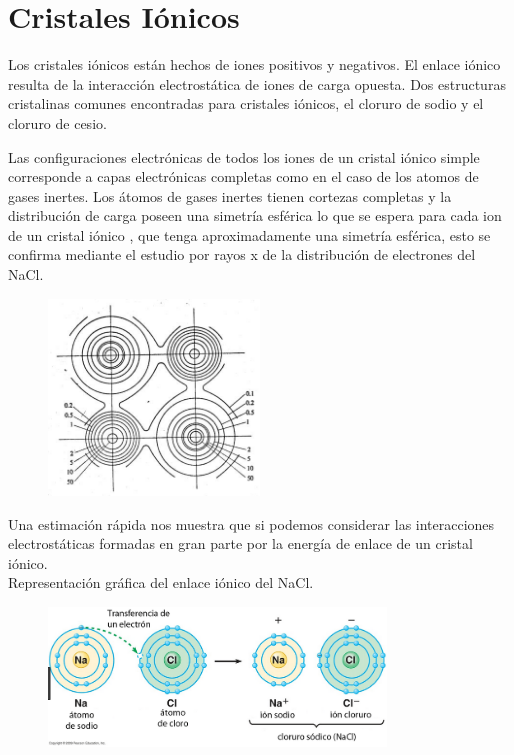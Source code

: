 \documentclass{article}
\begin{document}
\newpage

\section{Cristales Iónicos}

Los cristales iónicos están hechos de iones positivos y negativos. El enlace iónico resulta de la interacción electrostática  de iones de carga opuesta. Dos estructuras cristalinas comunes encontradas para cristales iónicos, el cloruro de sodio  y el cloruro de cesio.

Las configuraciones electrónicas de todos los iones de un cristal iónico simple corresponde a capas electrónicas completas como en el caso de los atomos de gases inertes. Los átomos de gases inertes tienen cortezas completas y la distribución de carga poseen una simetría esférica lo que se espera para cada ion de un cristal iónico , que tenga aproximadamente una simetría esférica, esto se confirma mediante el estudio por rayos x  de la distribución de electrones del NaCl.

\begin{figure}[h]
\centering
\includegraphics[width=0.5\textwidth]{a6.png}
\caption{}
\end{figure}

Una estimación rápida  nos muestra que si podemos considerar las interacciones electrostáticas formadas en gran parte por la energía de enlace de un cristal iónico.\\

Representación gráfica del enlace iónico del NaCl.

\begin{figure}[h]
\centering
\includegraphics[width=0.8\textwidth]{a11.png}
\caption{}
\end{figure}
\end{document}
